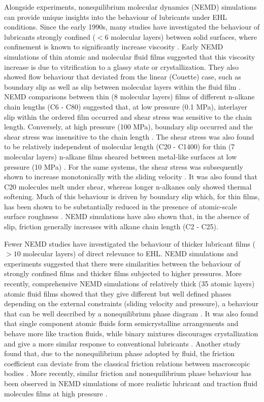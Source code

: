 \documentclass[aps,prb,reprint,superscriptaddress, a4paper]{revtex4-1}
\begin{document}
Alongside experiments, nonequilibrium molecular dynamics (NEMD) simulations can provide unique insights into the behaviour of lubricants under EHL conditions\cite{Ewen2018}. Since the early 1990s, many studies have investigated the behaviour of lubricants strongly confined ($< 6$ molecular layers) between solid surfaces, where confinement is known to significantly increase viscosity \cite{Granick1991}. Early NEMD simulations of thin atomic and molecular fluid films suggested that this viscosity increase is due to vitrification to a glassy state or crystallization\cite{Thompson1992}. They also showed flow behaviour that deviated from the linear (Couette) case, such as boundary slip as well as slip between molecular layers within the fluid film \cite{Thompson1990}. NEMD comparisons between thin (8 molecular layers) films of different n-alkane chain lengths (C6 - C80) suggested that, at low pressure (0.1 MPa), interlayer slip within the ordered film occurred and shear stress was sensitive to the chain length. Conversely, at high pressure (100 MPa), boundary slip occurred and the shear stress was insensitive to the chain length \cite{Koike1998}. The shear stress was also found to be relatively independent of molecular length (C20 - C1400) for thin (7 molecular layers) n-alkane films sheared between metal-like surfaces at low pressure (10 MPa) \cite{Sivebaek2008}. For the same systems, the shear stress was subsequently shown to increase monotonically with the sliding velocity \cite{Sivebaek2010}. It was also found that C20 molecules melt under shear, whereas longer n-alkanes only showed thermal softening\cite{Sivebaek2012}. Much of this behaviour is driven by boundary slip which, for thin films, has been shown to be substantially reduced in the presence of atomic-scale surface roughness \cite{Gao2000}. NEMD simulations have also shown that, in the absence of slip, friction generally increases with alkane chain length (C2 - C25)\cite{Savio2012}.

Fewer NEMD studies have investigated the behaviour of thicker lubricant films ($> 10$ molecular layers) of direct relevance to EHL. NEMD simulations \cite{Thompson1992,Robbins1996} and experiments \cite{VanAlsten1988} suggested that there were similarities between the behaviour of strongly confined films and thicker films subjected to higher pressures. More recently, comprehensive NEMD simulations of relatively thick (35 atomic layers) atomic fluid films showed that they give different but well defined phases depending on the external constraints (sliding velocity and pressure), a behaviour that can be well described by a nonequilibrium phase diagram \cite{Heyes2012}. It was also found that single component atomic fluids form semicrystalline arrangements and behave more like traction fluids, while binary mixtures discourages crystallization and give a more similar response to conventional lubricants \cite{Gattinoni2013}. Another study found that, due to the nonequilibrium phase adopted by fluid, the friction coefficient can deviate from the classical friction relations between macroscopic bodies \cite{Mackowiak2016}. More recently, similar friction and nonequilibrium phase behaviour has been observed in NEMD simulations of more realistic lubricant and traction fluid molecules films at high pressure \cite{Ewen2017a}.
\end{document}
